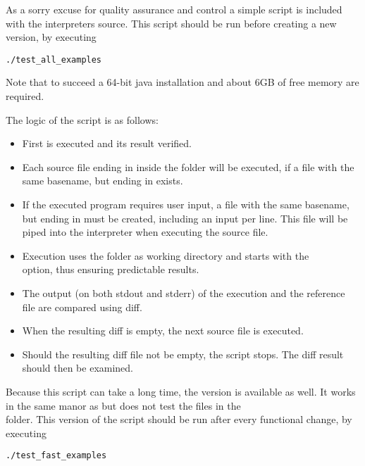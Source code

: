 As a sorry excuse for quality assurance and control a simple  script is included with the interpreters source.
This script should be run before creating a new version, by executing

\begin{lstlisting}[frame=none,numbers=none]
./test_all_examples
\end{lstlisting}

Note that to succeed a 64-bit java installation and about 6GB of free memory are required.

The logic of the script is as follows:
\begin{itemize}
	\item First  is executed and its result verified.
	\item Each source file ending in  inside the  folder will be executed, if a file with the same basename, but ending in  exists.
	\item If the executed program requires user input, a file with the same basename, but ending in  must be created, including an input per line. This file will be piped into the interpreter when executing the source file.
	\item Execution uses the  folder as working directory and starts \setlX{} with the\\
	       option, thus ensuring predictable results. 
	\item The output (on both stdout and stderr) of the execution and the reference file are compared using diff.
	\item When the resulting diff is empty, the next source file is executed.
	\item Should the resulting diff file not be empty, the script stops. The diff result should then be examined.
\end{itemize}

Because this script can take a long time, the  version is available as well.
It works in the same manor as  but does not test the files in the\\
 folder.
This version of the script should be run after every functional change, by executing

\begin{lstlisting}[frame=none,numbers=none]
./test_fast_examples
\end{lstlisting}

